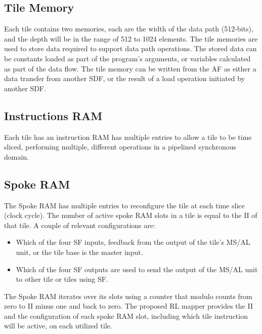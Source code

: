 \subsection{Tile Memory}
Each tile contains two memories, each are the width of the data path (512-bits), and the depth will be in the range of 512 to 1024 elements.
The tile memories are used to store data required to support data path operations.
The stored data can be constants loaded as part of the program's arguments, or variables calculated as part of the data flow.
The tile memory can be written from the AF as either a data transfer from another SDF, or the result of a load operation initiated by another SDF.

\subsection{Instructions RAM}
Each tile has an instruction RAM has multiple entries to allow a tile to be time sliced, performing multiple, different operations in a pipelined synchronous domain.

\subsection{Spoke RAM}
The Spoke RAM has multiple entries to reconfigure the tile at each time slice (clock cycle).
The number of active spoke RAM slots in a tile is equal to the II of that tile.
A couple of relevant configurations are: 

\begin{itemize}
  \item Which of the four SF inputs, feedback from the output of the tile's MS/AL unit, or the tile base is the master input.
  \item Which of the four SF outputs are used to send the output of the MS/AL unit to other tile or tiles using SF.
\end{itemize}

The Spoke RAM iterates over its slots using a counter that modulo counts from zero to II minus one and back to zero.
The proposed RL mapper provides the II and the configuration of each spoke RAM slot, including which tile instruction will be active, on each utilized tile.

